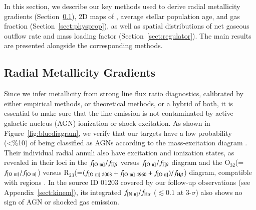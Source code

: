 In this section, we describe our key methods used to derive radial metallicity gradients (Section~\ref{sect:metalgrad}), 2D maps 
of \SFR, average stellar population age, and gas fraction (Section~\ref{sect:physprop}), as well as spatial 
distributions of net gaseous outflow rate and mass loading factor (Section~\ref{sect:regulator}).
The main results are presented alongside the corresponding methods.


\subsection{Radial Metallicity Gradients}\label{sect:metalgrad}

Since we infer metallicity from strong line flux ratio diagnostics, calibrated by either empirical methods, or 
theoretical methods, or a hybrid of both, it is essential to make sure that the line emission is not 
contaminated by active galactic nucleus (AGN) ionization or shock excitation.
As shown in Figure~\ref{fig:bluediagram}, we verify that our targets have a low probability (<\%10) of being 
classified as AGNs according to the mass-excitation diagram \citep{Juneau:2014ca}.
Their individual radial annuli also have excitation and ionization states, as revealed in their loci in the 
$f_{[\textrm{O}~\textsc{iii}]}/f_{\textrm{H}\beta}$ versus $f_{[\textrm{O}~\textsc{ii}]}/f_{\textrm{H}\beta}$ diagram and the O$_{32}$(=$f_{[\textrm{O}~\textsc{iii}]}/f_{[\textrm{O}~\textsc{ii}]}$) versus 
R$_{23}$(=$(f_{[\textrm{O}~\textsc{iii}]~5008} + f_{[\textrm{O}~\textsc{iii}]~4960} + f_{[\textrm{O}~\textsc{ii}]})/f_{\textrm{H}\beta}$) diagram,
compatible with \HII regions \citep{Lamareille:2004jk,Rodrigues:2012dr,2015ApJ...813..126J}.
In the source ID 01203 covered by our follow-up \osiris observations (see Appendix~\ref{sect:kinem}), its 
integrated $f_{[\textrm{N}~\textsc{ii}]}/f_{\textrm{H}\alpha}$ ($\lesssim0.1$ at 3-$\sigma$) also shows no sign of AGN or shocked gas emission.

